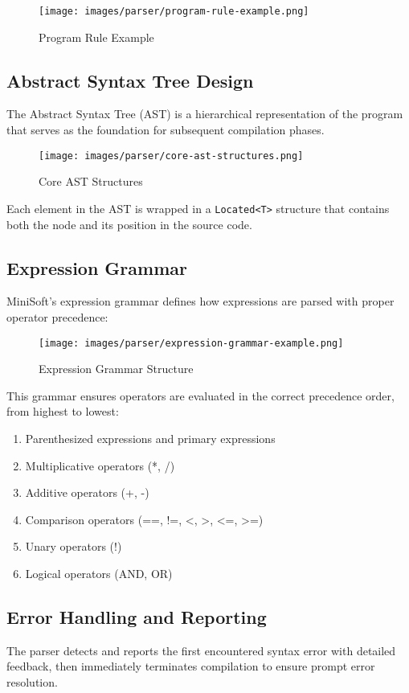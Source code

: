 \documentclass[12pt,a4paper]{article}
\begin{document}
\begin{figure}[H]
	\centering
	\texttt{[image: images/parser/program-rule-example.png]}
	\caption{Program Rule Example}
\end{figure}

\subsection{Abstract Syntax Tree Design}
The Abstract Syntax Tree (AST) is a hierarchical representation of the program that serves as the foundation for subsequent compilation phases.

\begin{figure}[H]
	\centering
	\texttt{[image: images/parser/core-ast-structures.png]}
	\caption{Core AST Structures}
\end{figure}

Each element in the AST is wrapped in a \texttt{Located<T>} structure that contains both the node and its position in the source code.

\subsection{Expression Grammar}
MiniSoft's expression grammar defines how expressions are parsed with proper operator precedence:

\begin{figure}[H]
	\centering
	\texttt{[image: images/parser/expression-grammar-example.png]}
	\caption{Expression Grammar Structure}
\end{figure}

This grammar ensures operators are evaluated in the correct precedence order, from highest to lowest:
\begin{enumerate}
	\item Parenthesized expressions and primary expressions
	\item Multiplicative operators (*, /)
	\item Additive operators (+, -)
	\item Comparison operators (==, !=, <, >, <=, >=)
	\item Unary operators (!)
	\item Logical operators (AND, OR)
\end{enumerate}

\subsection{Error Handling and Reporting}
The parser detects and reports the first encountered syntax error with detailed feedback, then immediately terminates compilation to ensure prompt error resolution.
\end{document}

